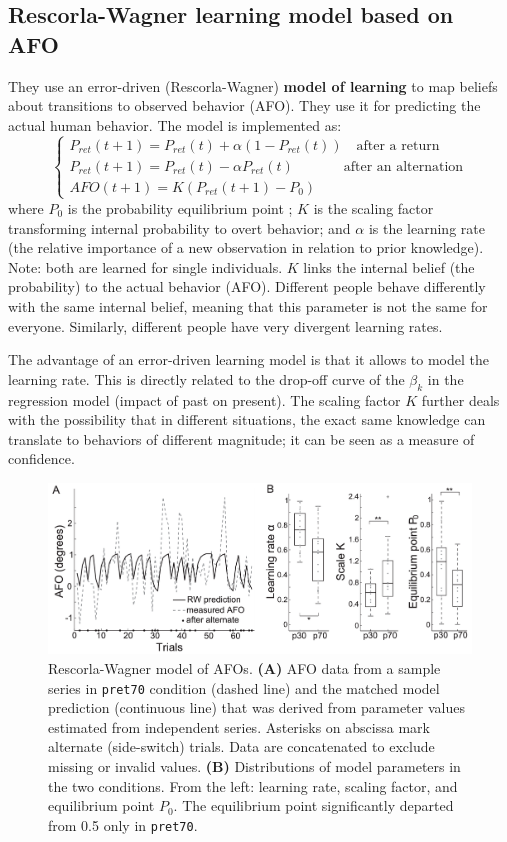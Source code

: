 \subsection{Rescorla-Wagner learning model based on AFO}
They use an error-driven (Rescorla-Wagner) \textbf{model of learning} to map beliefs about transitions to observed behavior (AFO). They use it for predicting the actual human behavior. The model is implemented as:
\[
\begin{cases}
    P_{ret}(t+1) = P_{ret}(t) + \alpha(1-P_{ret}(t)) \quad \text{after a return}\\
    P_{ret}(t+1) = P_{ret}(t) - \alpha P_{ret}(t) \quad \quad \quad \;\; \text{after an alternation}\\
    AFO(t+1) = K(P_{ret}(t+1)-P_0)
\end{cases}
\]
where $P_0$ is the probability equilibrium point \notet; $K$ is the scaling factor transforming internal probability to overt behavior; and $\alpha$ is the learning rate (the relative importance of a new observation in relation to prior knowledge). Note: both are learned for single individuals. $K$ links the internal belief (the probability) to the actual behavior (AFO). Different people behave differently with the same internal belief, meaning that this parameter is not the same for everyone. Similarly, different people have very divergent learning rates.

The advantage of an error-driven learning model is that it allows to model the learning rate. This is directly related to the drop-off curve of the $\beta_k$ in the regression model (impact of past on present). The scaling factor $K$ further deals with the possibility that in different situations, the exact same knowledge can translate to behaviors of different magnitude; it can be seen as a measure of confidence.

\begin{figure}[!ht]
    \centering
    \captionsetup{width=.8\linewidth}
    \includegraphics[width=0.75\linewidth]{images/rescorla.png}
    \caption{Rescorla-Wagner model of AFOs. \textbf{(A)} AFO data from a sample series in \texttt{pret70} condition (dashed line) and the matched model prediction (continuous line) that was derived from parameter values estimated from independent series. Asterisks on abscissa mark alternate (side-switch) trials. Data are concatenated to exclude missing or invalid values. \textbf{(B)} Distributions of model parameters in the two conditions. From the left: learning rate, scaling factor, and equilibrium point $P_0$. The equilibrium point significantly departed from 0.5 only in \texttt{pret70}.}
    \label{fig:rescorla}
\end{figure}

